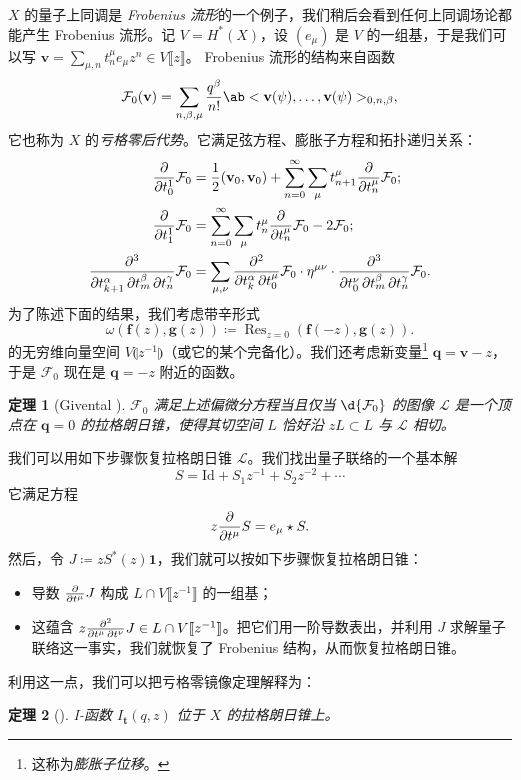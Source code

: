 \documentclass{amsart}
\newtheorem{thm}{定理}[section]
\theoremstyle{definition}
\theoremstyle{remark}
\theoremstyle{plain}
\theoremstyle{definition}
\theoremstyle{remark}
\newcommand{\mc}[1]{\mathcal{#1}}
\newcommand{\mbf}[1]{\mathbf{#1}}
\newcommand{\bv}{\mbf{v}}
\newcommand{\bq}{\mbf{q}}
\newcommand{\mr}[1]{\mathrm{#1}}
\newcommand{\on}[1]{\operatorname{#1}}
\newcommand{\1}{\mathbf{1}}
\newcommand{\2}{\mathbf{2}}
\newcommand{\3}{\mathbf{3}}
\newcommand{\ps}[1]{\llbracket #1 \rrbracket}
\newcommand{\ls}[1]{\llparenthesis #1 \rrparenthesis}
\begin{document}
\(X\) 的量子上同调是 \textit{Frobenius 流形}的一个例子，我们稍后会看到任何上同调场论都能产生 Frobenius 流形。记 \(V = H^*(X)\)，设 \((e_{\mu})\) 是 \(V\) 的一组基，于是我们可以写 $\bv = \sum_{\mu,n} t^{\mu}_n e_{\mu} z^n \in V\ps{z}$。
Frobenius 流形的结构来自函数
\[
    \mc{F}_0(\bv) = \sum_{n, \beta, \mu} \frac{q^{\beta}}{n!} \ab<\bv(\psi), \ldots, \bv(\psi)>_{0,n,\beta},
\]
它也称为 \(X\) 的\textit{亏格零后代势}。它满足弦方程、膨胀子方程和拓扑递归关系：
\begin{align*}
    \pdv{}{t_0^1} \mc{F}_0 &= \frac{1}{2} (\bv_0, \bv_0) + \sum_{n=0}^{\infty} \sum_{\mu} t_{n+1}^{\mu} \pdv{}{t_n^{\mu}} \mc{F}_0; \\
    \pdv{}{t_1^1} \mc{F}_0 &= \sum_{n=0}^{\infty} \sum_{\mu} t_n^{\mu} \pdv{}{t_n^{\mu}}\mc{F}_0 - 2 \mc{F}_0; \\
    \pdv{}{t_{k+1}^{\alpha},t_m^{\beta},t_n^{\gamma}} \mc{F}_0 &= \sum_{\mu,\nu} \pdv{}{t_k^{\alpha},t_0^{\mu}} \mc{F}_0 \cdot \eta^{\mu\nu} \cdot \pdv{}{t_0^{\nu},t_{m}^{\beta},t_n^{\gamma}} \mc{F}_0.
\end{align*}
为了陈述下面的结果，我们考虑带辛形式
\[ \omega(\mbf{f}(z), \mbf{g}(z)) \coloneqq \on{Res}_{z=0}(\mbf{f}(-z), \mbf{g}(z)). \]
的无穷维向量空间 $V\ls{z^{-1}}$（或它的某个完备化）。我们还考虑新变量\footnote{这称为\textit{膨胀子位移}。} $\bq = \bv - z$，于是 $\mc{F}_0$ 现在是 $\bq = -z$ 附近的函数。

\begin{thm}[Givental {\cite{Givental2004}}]
    $\mc{F}_0$ 满足上述偏微分方程当且仅当 $\d{\mc{F}_0}$ 的图像 $\mc{L}$ 是一个顶点在 $\bq = 0$ 的拉格朗日锥，使得其切空间 $L$ 恰好沿 $zL \subset L$ 与 $\mc{L}$ 相切。
\end{thm}

我们可以用如下步骤恢复拉格朗日锥 \(\mc{L}\)。我们找出量子联络的一个基本解
\[ S = \mr{Id} + S_1 z^{-1} + S_2 z^{-2} + \cdots \]
它满足方程
\[ z \pdv{}{t^{\mu}}S = e_{\mu} \star S. \]
然后，令 $J \coloneqq z S^*(z) \1$，我们就可以按如下步骤恢复拉格朗日锥：
\begin{itemize}
    \item 导数 \(\pdv{}{t^{\mu}} J\) 构成 \(L \cap V\ps{z^{-1}}\) 的一组基；
    \item 这蕴含 \(z \pdv{}{t^{\mu},t^{\nu}} J \in L \cap V \ps{z^{-1}}\)。把它们用一阶导数表出，并利用 \(J\) 求解量子联络这一事实，我们就恢复了 Frobenius 结构，从而恢复拉格朗日锥。
\end{itemize}

利用这一点，我们可以把亏格零镜像定理解释为：
\begin{thm}[{\cite{Givental1998}}]
    I-函数 \(I_{\mbf{t}}(q,z)\) 位于 \(X\) 的拉格朗日锥上。
\end{thm}
\end{document}
